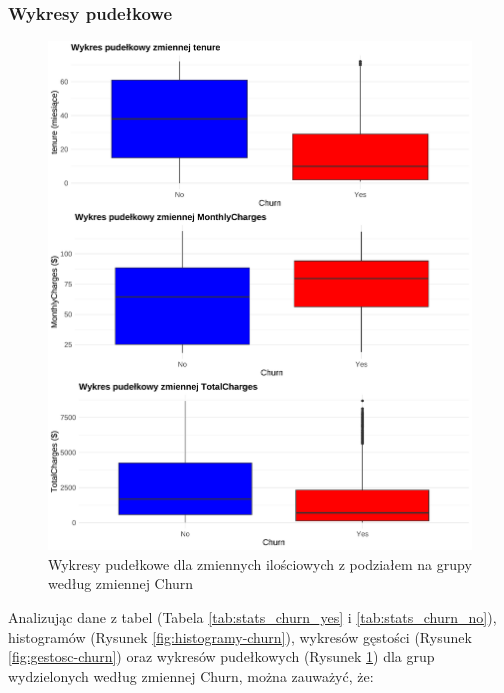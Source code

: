 \documentclass[12pt, a4paper]{article}\usepackage[]{graphicx}\usepackage[]{xcolor}
\makeatletter
\def\maxwidth{ %
  \ifdim\Gin@nat@width>\linewidth
    \linewidth
  \else
    \Gin@nat@width
  \fi
}
\newenvironment{knitrout}{}{} %
\makeatother
\begin{document}
\subsubsection{Wykresy pudełkowe}
\begin{knitrout}
\color{fgcolor}\begin{figure}[H]

{\centering \includegraphics[width=\maxwidth]{figure/boxploty-churn-1} 

}

\caption[Wykresy pudełkowe dla zmiennych ilościowych z podziałem na grupy według zmiennej Churn]{Wykresy pudełkowe dla zmiennych ilościowych z podziałem na grupy według zmiennej Churn}\label{fig:boxploty-churn}
\end{figure}

\end{knitrout}

\newpage
Analizując dane z tabel (Tabela \ref{tab:stats_churn_yes} i \ref{tab:stats_churn_no}), histogramów (Rysunek \ref{fig:histogramy-churn}), wykresów gęstości (Rysunek \ref{fig:gestosc-churn}) oraz wykresów pudełkowych (Rysunek \ref{fig:boxploty-churn}) dla grup wydzielonych według zmiennej Churn, można zauważyć, że:
\end{document}
